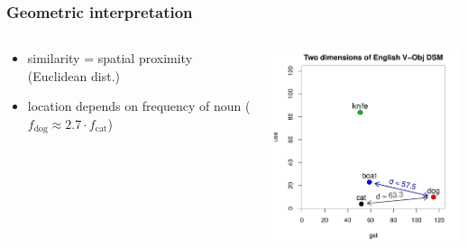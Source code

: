 \documentclass[t]{beamer} %
\begin{document}
\begin{frame}
  \frametitle{Geometric interpretation}

  \begin{columns}[T]
    \begin{column}{40mm}
      \begin{itemize}
      \item similarity = spatial proximity (Euclidean dist.)
      \item location depends on frequency of noun ($f_{\text{dog}} \approx 2.7\cdot f_{\text{cat}}$)
      \end{itemize}
    \end{column}
    \begin{column}{75mm}      
      \ungap[1]
      \includegraphics[width=75mm]{img/hieroglyph_2d_2}
    \end{column}
  \end{columns}
\end{frame}
\end{document}
